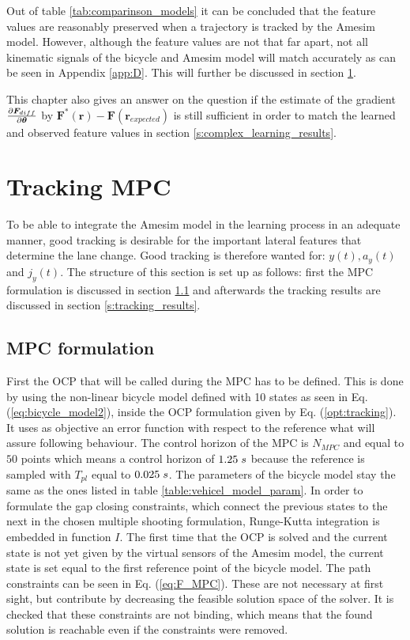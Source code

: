 Out of table \ref{tab:comparinson_models} it can be concluded that the feature values are reasonably preserved when a trajectory is tracked by the Amesim model.  However, although the feature values are not that far apart, not all kinematic signals of the bicycle and Amesim model will match accurately as can be seen in Appendix \ref{app:D}. This will further be discussed in section \ref{s:tracking_mpc}. 

This chapter also gives an answer on the question if the estimate of the gradient $\pdv{\bm{F}_{diff}}{\bm{\theta}}$ by $ \bm{F}^*(\bm{r}) - \bm{F}(\bm{r}_{expected})$ is still sufficient in order to match the learned and observed feature values in section \ref{s:complex_learning_results}.

\section{Tracking MPC} 
\label{s:tracking_mpc}
To be able to integrate the Amesim model in the learning process in an adequate manner, good tracking is desirable for the important lateral features that determine the lane change. Good tracking is therefore wanted for: $y(t), a_y(t)$ and $j_y(t)$. The structure of this section is set up as follows: first the MPC formulation is discussed in section \ref{s:mpc_form} and afterwards the tracking results are discussed in section \ref{s:tracking_results}.

\subsection{MPC formulation} \label{s:mpc_form}
First the OCP that will be called during the MPC has to be defined. This is done by using the non-linear bicycle model defined with 10 states as seen in Eq. (\ref{eq:bicycle_model2}), inside the OCP formulation given by Eq. (\ref{opt:tracking}). It uses as objective an error function with respect to the reference what will assure following behaviour. The control horizon of the MPC is $N_{MPC}$ and equal to $50$ points which means a control horizon of $1.25 \hspace{1mm}s$ because the reference is sampled with $T_{pl}$ equal to $0.025\hspace{1mm}s$. The parameters of the bicycle model stay the same as the ones listed in table \ref{table:vehicel_model_param}. In order to formulate the gap closing constraints, which connect the previous states to the next in the chosen multiple shooting formulation, Runge-Kutta integration is embedded in function $I$.  
The first time that the OCP is solved and the current state is not yet given by the virtual sensors of the Amesim model, the current state is set equal to the first reference point of the bicycle model. The path constraints can be seen in Eq. (\ref{eq:F_MPC}). These are not necessary at first sight, but contribute by decreasing the feasible solution space of the solver. It is checked that these constraints are not binding, which means that the found solution is reachable even if the constraints were removed. \newpage

